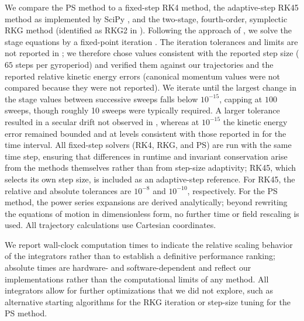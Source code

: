 \documentclass[draft]{agujournal2019}
\begin{document}
We compare the PS method to a fixed-step RK4 method, the adaptive-step RK45 method \cite{Dormand1980} as implemented by SciPy \cite{scipy}, and the two-stage, fourth-order, symplectic RKG method (identified as RKG2 in \cite{Yugo2007}). Following the approach of \cite{Yugo2007}, we solve the stage equations by a fixed-point iteration \cite{Calvo2003}. The iteration tolerances and limits are not reported in \cite{Yugo2001, Yugo2007}; we therefore chose values consistent with the reported step size ($65$ steps per gyroperiod) and verified them against our trajectories and the reported relative kinetic energy errors (canonical momentum values were not compared because they were not reported). We iterate until the largest change in the stage values between successive sweeps falls below $10^{-15}$, capping at $100$ sweeps, though roughly 10 sweeps were typically required. A larger tolerance resulted in a secular drift not observed in \cite{Yugo2007}, whereas at $10^{-15}$ the kinetic energy error remained bounded and at levels consistent with those reported in \cite{Yugo2007} for the time interval. All fixed-step solvers (RK4, RKG, and PS) are run with the same time step, ensuring that differences in runtime and invariant conservation arise from the methods themselves rather than from step-size adaptivity; RK45, which selects its own step size, is included as an adaptive-step reference. For RK45, the relative and absolute tolerances are $10^{-8}$ and $10^{-10}$, respectively. For the PS method, the power series expansions are derived analytically; beyond rewriting the equations of motion in dimensionless form, no further time or field rescaling is used. All trajectory calculations use Cartesian coordinates.


We report wall-clock computation times to indicate the relative scaling behavior of the integrators rather than to establish a definitive performance ranking; absolute times are hardware- and software-dependent and reflect our implementations rather than the computational limits of any method. All integrators allow for further optimizations that we did not explore, such as alternative starting algorithms for the RKG iteration or step-size tuning for the PS method.
\end{document}
